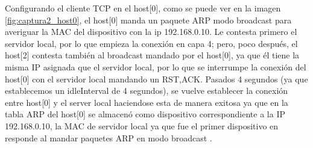 Configurando el cliente TCP en el host[0], como se puede ver en la imagen \ref{fig:captura2_host0}, el host[0] manda un paquete ARP modo broadcast para averiguar la MAC del dispositivo con la ip 192.168.0.10. Le contesta primero el servidor local, por lo que empieza la conexión en capa 4; pero, poco después, el host[2] contesta también al broadcast mandado por el host[0], ya que él tiene la misma IP asignada que el servidor local, por lo que se interrumpe la conexión del host[0] con el servidor local mandando un RST,ACK. Pasados 4 segundos (ya que establecemos un idleInterval de 4 segundos), se vuelve establecer la conexión entre host[0] y el server local haciendose esta de manera exitosa ya que en la tabla ARP del host[0] se almacenó como dispositivo correspondiente a la IP 192.168.0.10, la MAC de servidor local ya que fue el primer dispositivo en responde al mandar paquetes ARP en modo broadcast .
